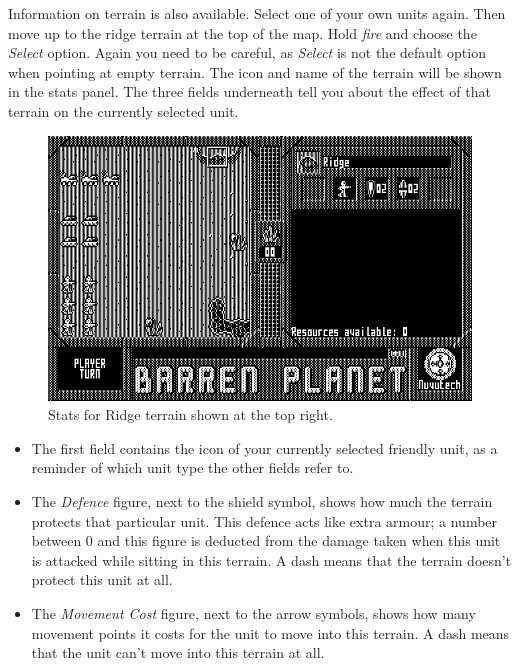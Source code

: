 Information on terrain is also available. Select one of your own units again. Then move up to the ridge terrain at the top of the map. Hold {\it fire} and choose the {\it Select} option. Again you need to be careful, as {\it Select} is not the default option when pointing at empty terrain. The icon and name of the terrain will be shown in the stats panel. The three fields underneath tell you about the effect of that terrain on the currently selected unit.

\begin{figure}[h]
  \includegraphics[width=\textwidth]{terrain-stats}
  \caption{Stats for Ridge terrain shown at the top right.}
\end{figure}
\begin{itemize}

\item The first field contains the icon of your currently selected friendly unit, as a reminder of which unit type the other fields refer to.

\item The {\it Defence} figure, next to the shield symbol, shows how much the terrain protects that particular unit. This defence acts like extra armour; a number between 0 and this figure is deducted from the damage taken when this unit is attacked while sitting in this terrain. A dash means that the terrain doesn't protect this unit at all.

\item The {\it Movement Cost} figure, next to the arrow symbols, shows how many movement points it costs for the unit to move into this terrain. A dash means that the unit can't move into this terrain at all.

\end{itemize}

